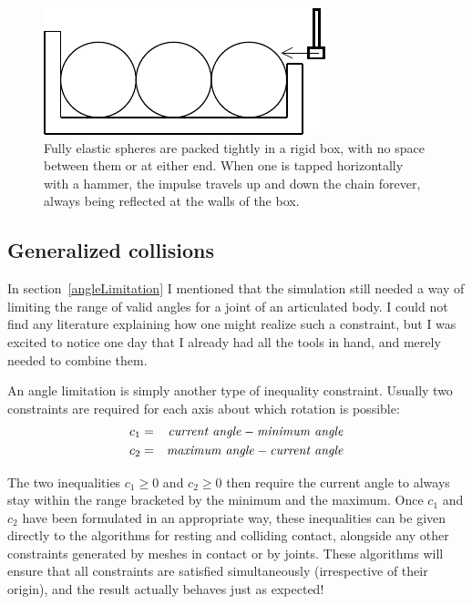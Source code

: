 \begin{figure}
\centerline{\includegraphics{figures/contacts3}}
\caption{Fully elastic spheres are packed tightly in a rigid box, with no space between them or at
    either end. When one is tapped horizontally with a hammer, the impulse travels up and down the
    chain forever, always being reflected at the walls of the box.\label{contacts3Figure}}
\end{figure}


\subsection{Generalized collisions\label{generalizedCollisions}}

In section~\ref{angleLimitation} I mentioned that the simulation still needed a way of limiting
the range of valid angles for a joint of an articulated body. I could not find any literature
explaining how one might realize such a constraint, but I was excited to notice one day that
I already had all the tools in hand, and merely needed to combine them.

An angle limitation is simply another type of inequality constraint. Usually two constraints are
required for each axis about which rotation is possible:
\begin{eqnarray}
c_1 & = & \mbox{\textit{current angle}} - \mbox{\textit{minimum angle}} \nonumber\\
c_2 & = & \mbox{\textit{maximum angle}} - \mbox{\textit{current angle}} \label{genCollIneq}
\end{eqnarray}

The two inequalities $c_1 \ge 0$ and $c_2 \ge 0$ then require the current angle to always stay
within the range bracketed by the minimum and the maximum. Once $c_1$ and $c_2$ have been
formulated in an appropriate way, these inequalities can be given directly to the algorithms
for resting and colliding contact, alongside any other constraints generated by meshes in contact
or by joints. These algorithms will ensure that all constraints are satisfied simultaneously
(irrespective of their origin), and the result actually behaves just as expected!

